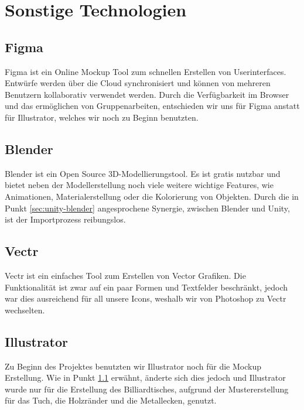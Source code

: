 \section{Sonstige Technologien}
\subsection{Figma} \label{sec:figma}
Figma ist ein Online Mockup Tool zum schnellen Erstellen von Userinterfaces. Entwürfe werden über die Cloud synchronisiert und können von mehreren Benutzern kollaborativ verwendet werden. Durch die Verfügbarkeit im Browser und das ermöglichen von Gruppenarbeiten, entschieden wir uns für Figma anstatt für Illustrator, welches wir noch zu Beginn benutzten.
\subsection{Blender}
Blender ist ein Open Source 3D-Modellierungstool. Es ist gratis nutzbar und bietet neben der Modellerstellung noch viele weitere wichtige Features, wie Animationen, Materialerstellung oder die Kolorierung von Objekten. Durch die in Punkt \ref{sec:unity-blender} angesprochene Synergie, zwischen Blender und Unity, ist der Importprozess reibungslos.
\subsection{Vectr}
Vectr ist ein einfaches Tool zum Erstellen von Vector Grafiken. Die Funktionalität ist zwar auf ein paar Formen und Textfelder beschränkt, jedoch war dies ausreichend für all unsere Icons, weshalb wir von Photoshop zu Vectr wechselten.
\subsection{Illustrator}
Zu Beginn des Projektes benutzten wir Illustrator noch für die Mockup Erstellung. Wie in Punkt \ref{sec:figma} erwähnt, änderte sich dies jedoch und Illustrator wurde nur für die Erstellung des Billiardtisches, aufgrund der Mustererstellung für das Tuch, die Holzränder und die Metallecken, genutzt.